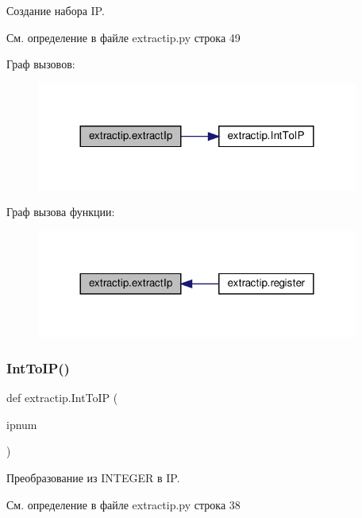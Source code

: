 Создание набора IP. 



См. определение в файле extractip.\+py строка 49

Граф вызовов\+:\nopagebreak
\begin{figure}[H]
\begin{center}
\leavevmode
\includegraphics[width=300pt]{namespaceextractip_a618ef8385421a257b0d4e90b39fd6050_cgraph}
\end{center}
\end{figure}
Граф вызова функции\+:\nopagebreak
\begin{figure}[H]
\begin{center}
\leavevmode
\includegraphics[width=300pt]{namespaceextractip_a618ef8385421a257b0d4e90b39fd6050_icgraph}
\end{center}
\end{figure}
\mbox{\label{namespaceextractip_a027ec0c1479a189825c3ddcfefa0622d}} 
\subsubsection{\texorpdfstring{Int\+To\+I\+P()}{IntToIP()}}
{\footnotesize\ttfamily def extractip.\+Int\+To\+IP (\begin{DoxyParamCaption}\item[{}]{ipnum }\end{DoxyParamCaption})}



Преобразование из I\+N\+T\+E\+G\+ER в IP. 



См. определение в файле extractip.\+py строка 38

